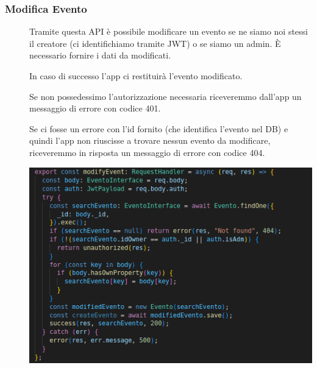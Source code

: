 \documentclass{article}
\begin{document}
\subsubsection{Modifica Evento}
\begin{description}
    \item[] Tramite questa API è possibile modificare un evento se ne siamo noi stessi il creatore (ci identifichiamo tramite JWT) o se siamo un admin. È necessario fornire i dati da modificati.
    \item[] In caso di successo l'app ci restituirà l'evento modificato.
    \item[] Se non possedessimo l'autorizzazione necessaria riceveremmo dall'app un messaggio di errore con codice 401.
    \item[] Se ci fosse un errore con l'id fornito (che identifica l'evento nel DB) e quindi l'app non riuscisse a trovare nessun evento da modificare, riceveremmo in risposta un messaggio di errore con codice 404.
    \item[] \begin{center}
            \includegraphics[scale=0.5]{modifyEvent.png}
        \end{center}
\end{description}
\end{document}
